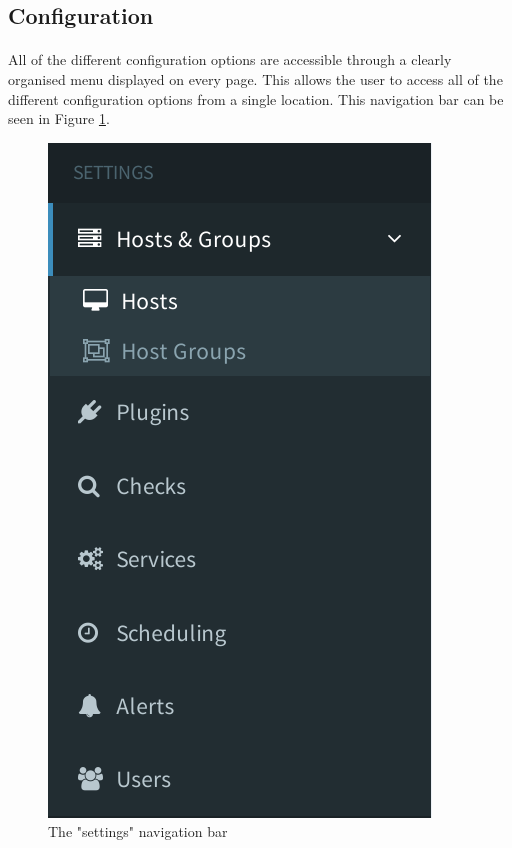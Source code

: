 \documentclass[bsc,logo,twoside,singlespacing]{infthesis}
\begin{document}

\subsection{Configuration}
\paragraph*{}
	All of the different configuration options are accessible through a clearly
	organised menu displayed on every page.  This allows the user to access all of
	the different configuration options from a single location.  This navigation
	bar can be seen in Figure \ref{settings-nav}.

\begin{figure}[H]
	\centering
	\caption{The "settings" navigation bar}
	\label{settings-nav}
	\includegraphics[scale=0.7]{assets/screenshots/settings-nav.pdf}
\end{figure}
	
\end{document}
